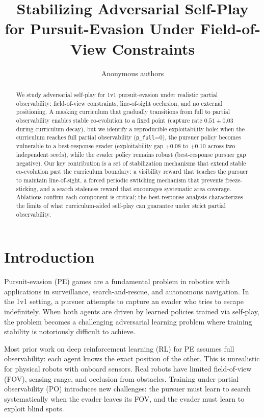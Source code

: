\documentclass[letterpaper, 10 pt, conference]{ieeeconf}
\title{Stabilizing Adversarial Self-Play for Pursuit-Evasion Under Field-of-View Constraints}
\author{Anonymous authors}
\begin{document}
\maketitle
\thispagestyle{empty}
\pagestyle{empty}

\begin{abstract}
We study adversarial self-play for 1v1 pursuit-evasion under realistic partial
observability: field-of-view constraints, line-of-sight occlusion, and no external
positioning. A masking curriculum that gradually transitions from full to partial
observability enables stable co-evolution to a fixed point (capture rate
$0.51\pm0.03$ during curriculum decay), but we identify a reproducible
exploitability hole: when the curriculum reaches full partial observability
(\texttt{p\_full}=0), the pursuer policy becomes vulnerable to a best-response
evader (exploitability gap $+0.08$ to $+0.10$ across two independent seeds),
while the evader policy remains robust (best-response pursuer gap negative).
Our key contribution is a set of stabilization mechanisms that extend stable
co-evolution past the curriculum boundary: a visibility reward that teaches the
pursuer to maintain line-of-sight, a forced periodic switching mechanism that
prevents freeze-sticking, and a search staleness reward that encourages
systematic area coverage. Ablations confirm each component is critical; the
best-response analysis characterizes the limits of what curriculum-aided
self-play can guarantee under strict partial observability.
\end{abstract}

\section{Introduction}
\label{sec:introduction}

Pursuit-evasion (PE) games are a fundamental problem in robotics with applications in
surveillance, search-and-rescue, and autonomous navigation. In the 1v1 setting, a pursuer
attempts to capture an evader who tries to escape indefinitely. When both agents are
driven by learned policies trained via self-play, the problem becomes a challenging
adversarial learning problem where training stability is notoriously difficult to achieve.

Most prior work on deep reinforcement learning (RL) for PE assumes full observability:
each agent knows the exact position of the other. This is unrealistic for physical robots
with onboard sensors. Real robots have limited field-of-view (FOV), sensing range, and
occlusion from obstacles. Training under partial observability (PO) introduces new
challenges: the pursuer must learn to search systematically when the evader leaves its
FOV, and the evader must learn to exploit blind spots.
\end{document}
